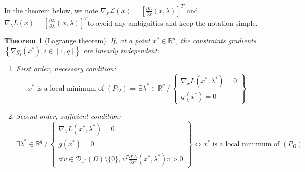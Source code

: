 \documentclass{article}
\newtheorem*{theorem}{Theorem}
\begin{document}
\noindent In the theorem below, we note $\nabla_x \mathcal{L}(x) = \left[\frac{\partial L}{\partial x}(x,\lambda)\right]^T$ and $\nabla_\lambda L(x) = \left[\frac{\partial \mathcal{L}}{\partial \lambda}(x,\lambda)\right]^T$to avoid any ambiguities and keep the notation simple.
\begin{theorem}[Lagrange theorem]
If, at a point $x^*\in\mathbb{R}^n$, the constraints gradients $\left\{ \nabla g_i(x^*), i\in
[1,q] \right\}$ are linearly independent:
\begin{enumerate}
\item First order, necessary condition:
\begin{equation*}
x^*\textrm{ is a local minimum of }\left(P_\Omega\right) \Rightarrow \exists \lambda^*\in\mathbb{R}^q \ / \
\left\{\begin{array}{c}
\nabla_x L(x^*,\lambda^*)=0 \\
g(x^*)=0
\end{array}
\right\}
\end{equation*}
\item Second order, sufficient condition:
\begin{equation*}
\exists \lambda^*\in\mathbb{R}^q \ / \
\left\{\begin{array}{c}
\nabla_x L(x^*,\lambda^*)=0 \\
g(x^*)=0 \\
\forall v\in\mathcal{D}_{x^*}(\Omega)\setminus\{0\}, v^T \frac{\partial^2
L}{\partial x^2}(x^*,\lambda^*) v > 0 
\end{array}
\right\} \Leftrightarrow x^* \textrm{ is a local minimum of }
\left(P_\Omega\right)
\end{equation*}
\end{enumerate}
\end{theorem}
\end{document}
